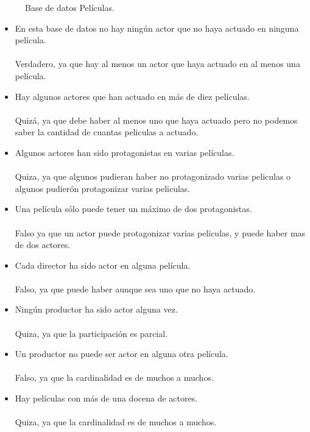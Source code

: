 \documentclass{article}
\begin{document}
\begin{enumerate}
\begin{figure}[H]
				\caption{Base de datos Películas.}
			\end{figure}
			\begin{itemize}
				\item En esta base de datos no hay ningún actor que no haya actuado en ninguna película.
				\\\\Verdadero, ya que hay al menos un actor que haya actuado en al menos una película.\\
				\item Hay algunos actores que han actuado en más de diez películas.
				\\\\Quizá, ya que debe haber al menos uno que haya actuado pero no podemos saber la cantidad de cuantas peliculas a actuado.\\
				\item Algunos actores han sido protagonistas en varias películas.
				\\\\Quiza, ya que algunos pudieran haber no protagonizado varias peliculas o algunos pudierón protagonizar varias peliculas.\\				
				\item Una película sólo puede tener un máximo de dos protagonistas.
				\\\\Falso ya que un actor puede protagonizar varias peliculas, y puede haber mas de dos actores.\\
				\item Cada director ha sido actor en alguna película.
				\\\\Falso, ya que puede haber aunque sea uno que no haya actuado.\\
				\item Ningún productor ha sido actor alguna vez.
				\\\\Quiza, ya que la participación es parcial.\\
				\item Un productor no puede ser actor en alguna otra película.
				\\\\Falso, ya que la cardinalidad es de muchos a muchos.\\
				\item Hay películas con más de una docena de actores.
				\\\\Quiza, ya que la cardinalidad es de muchos a muchos.\\

\end{itemize}
\end{enumerate}
\end{document}
